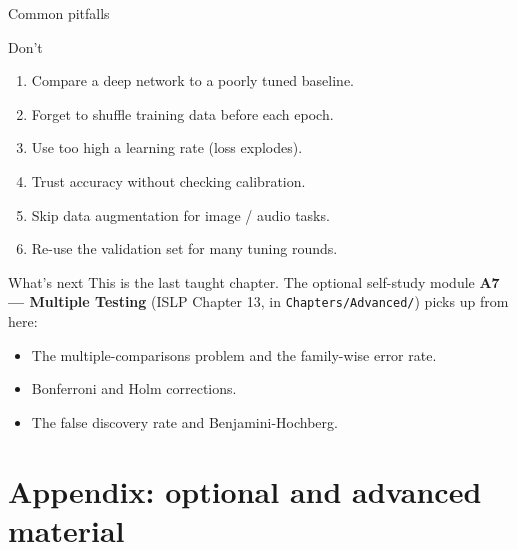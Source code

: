 \documentclass[aspectratio=169,11pt]{beamer}
\begin{document}
\begin{frame}{Common pitfalls}
  \begin{alertblock}{Don't}
    \begin{enumerate}
      \item Compare a deep network to a poorly tuned baseline.
      \item Forget to shuffle training data before each epoch.
      \item Use too high a learning rate (loss explodes).
      \item Trust accuracy without checking calibration.
      \item Skip data augmentation for image / audio tasks.
      \item Re-use the validation set for many tuning rounds.
    \end{enumerate}
  \end{alertblock}
\end{frame}

\begin{frame}{What's next}
  This is the last taught chapter. The optional self-study module
  \textbf{A7 --- Multiple Testing} (ISLP Chapter 13, in
  \texttt{Chapters/Advanced/}) picks up from here:
  \begin{itemize}
    \item The multiple-comparisons problem and the family-wise error rate.
    \item Bonferroni and Holm corrections.
    \item The false discovery rate and Benjamini-Hochberg.
  \end{itemize}
\end{frame}


\appendix
\AtBeginSection[]{}
\section{Appendix: optional and advanced material}
\end{document}
